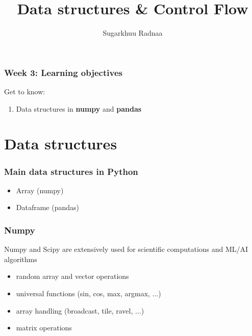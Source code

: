 \documentclass{beamer}
\title[Introduction to Python]{Data structures \& Control Flow}
\author{Sugarkhuu Radnaa}
\institute[]
{
Py4Econ in Ulaanbaatar \\ 
\medskip
\textit{py4econ@gmail.com} 
}
\date{}  %
\begin{document}
\begin{frame}
\titlepage %
\end{frame}

\begin{frame}
    \frametitle{Week 3: Learning objectives}
    Get to know: 
    \begin{enumerate}
        \item Data structures in \textbf{numpy} and \textbf{pandas}
    \end{enumerate}
\end{frame}

\section{Data structures} 

\begin{frame}
\frametitle{Main data structures in Python}
    \begin{itemize}
        \item Array (numpy)
        \item Dataframe (pandas)
    \end{itemize}
\end{frame}

\begin{frame}
    \frametitle{Numpy}
    Numpy and Scipy are extensively used for scientific computations and ML/AI algorithms
    \begin{itemize}
        \item random array and vector operations
        \item universal functions (sin, cos, max, argmax, ...)
        \item array handling (broadcast, tile, ravel, ...)
        \item matrix operations
    \end{itemize}
\end{frame}
\end{document}

